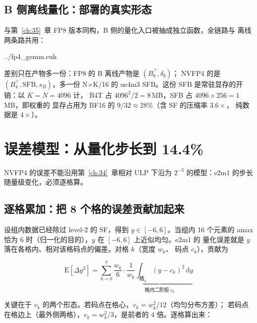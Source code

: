 \subsection{B 侧离线量化：部署的真实形态}

与第~\ref{ch:35}~章 FP8 版本同构，B 侧的量化入口被抽成独立函数，全链路与
离线两条路共用：

\begin{lstinputlisting}[linerange={367-393},firstnumber=auto,
  title={fp4\_gemm.cuh L367-393（B 量化入口：全链路与离线共用）}]{../fp4_gemm.cuh}
\end{lstinputlisting}

差别只在产物多一份：FP8 的 B 离线产物是 $(B_8^{\top}, \delta_b)$；
NVFP4 的是 $(B_4^{\top}, \mathrm{SFB}, s_B)$，多一份 N$\times$K/16
的 ue4m3 SFB。这份 SFB 是常驻显存的开销：以 $K{=}N{=}4096$ 计，
B4T 占 $4096^2/2 = 8$\,MB，SFB 占 $4096 \times 256 = 1$\,MB，即权重的
显存占用为 BF16 的 $9/32 \approx 28\%$（含 SF 的压缩率 $3.6\times$，
纯数据是 $4\times$）。

\section{误差模型：从量化步长到 14.4\%}\label{sec:36-err}

NVFP4 的误差不能沿用第~\ref{ch:34}~章相对 ULP 下沿为
$2^{-3}$ 的模型：e2m1 的步长随量级变化，必须逐格算。

\subsection{逐格累加：把 8 个格的误差贡献加起来}

设组内数据已经除过 level-2 的 SF，得到 $y \in [-6,6]$。当组内 16 个元素的
amax 恰为 $6$ 时（归一化的目的），$y$ 在 $[-6,6]$ 上近似均匀。e2m1 的
量化误差就是 $y$ 落在各格内、相对该格码点的偏差。对格 $k$（宽度 $w_k$、
码点 $c_k$），贡献为

\begin{equation}
  \mathrm{E}\!\left[\Delta y^2\right]
  = \sum_{k=0}^{7} \frac{w_k}{6}\cdot
    \underbrace{\frac{1}{w_k}\int_{\text{格}_k}(y-c_k)^2\,\mathrm{d}y}
              _{\text{格内二阶矩}\;v_k}
  \label{eq:36-grid}
\end{equation}

关键在于 $v_k$ 的两个形态。若码点在格心，$v_k = w_k^2/12$（均匀分布方差）；
若码点在格边上（最外侧两格），$v_k = w_k^2/3$，是前者的
4 倍。逐格算出来：

